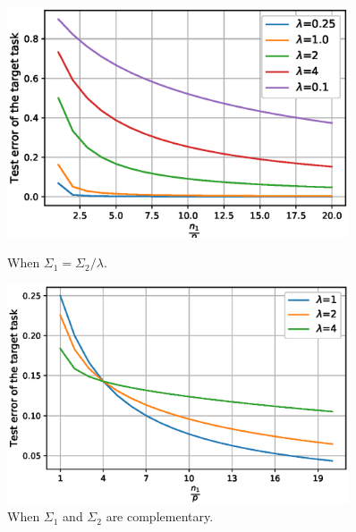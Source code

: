 \begin{figure}
	\centering
	\begin{minipage}{0.48\textwidth}
		\centering
		\includegraphics[width=0.9\textwidth]{figures/scaling.eps}
		\caption{When $\Sigma_1 = \Sigma_2 / \lambda$.}
		\label{fig_te_scaling}
	\end{minipage}\hfill
	\begin{minipage}{0.48\textwidth}
		\centering
		\includegraphics[width=0.9\textwidth]{figures/complementary.eps}
		\caption{When $\Sigma_1$ and $\Sigma_2$ are complementary.}
		\label{fig_te_complement}
	\end{minipage}
\end{figure}


